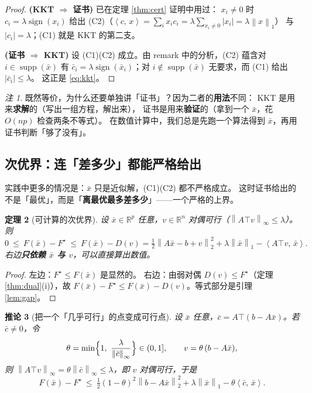 \documentclass[11pt,a4paper,UTF8]{ctexart}
\theoremstyle{plain}
\newtheorem{theorem}{定理}[section]
\newtheorem{corollary}[theorem]{推论}
\theoremstyle{definition}
\theoremstyle{remark}
\newtheorem{remark}[theorem]{注}
\newcommand{\R}{\mathbb{R}}
\newcommand{\norm}[1]{\left\lVert #1 \right\rVert}
\newcommand{\abs}[1]{\left\lvert #1 \right\rvert}
\newcommand{\inner}[2]{\left\langle #1,\, #2 \right\rangle}
\newcommand{\supp}{\operatorname{supp}}
\DeclareMathOperator{\sign}{sign}
\begin{document}
\begin{proof}
\textbf{(KKT $\Rightarrow$ 证书)} 已在定理 \ref{thm:cert} 证明中用过：
$x_i\neq0$ 时 $c_i=\lambda\sign(x_i)$ 给出 (C2)（$\inner cx=\sum_i x_ic_i=\lambda\sum_{x_i\neq0}\abs{x_i}=\lambda\norm x_1$）
与 $\abs{c_i}=\lambda$；(C1) 就是 KKT 的第二支。

\textbf{(证书 $\Rightarrow$ KKT)} 设 (C1)(C2) 成立。由 remark 中的分析，(C2) 蕴含对 $i\in\supp(\bar x)$
有 $\bar c_i=\lambda\sign(\bar x_i)$；对 $i\notin\supp(\bar x)$ 无要求，而 (C1) 给出 $\abs{\bar c_i}\le\lambda$。
这正是 \eqref{eq:kkt}。
\end{proof}

\begin{remark}
既然等价，为什么还要单独讲「证书」？因为二者的\textbf{用法}不同：
KKT 是用来\textbf{求解}的（写出一组方程，解出来），
证书是用来\textbf{验证}的（拿到一个 $\bar x$，花 $O(np)$ 检查两条不等式）。
在数值计算中，我们总是先跑一个算法得到 $\bar x$，再用证书判断「够了没有」。
\end{remark}

\subsection{次优界：连「差多少」都能严格给出}

实践中更多的情况是：$\bar x$ 只是近似解，(C1)(C2) 都不严格成立。
这时证书给出的不是「最优」，而是「\textbf{离最优最多差多少}」——一个严格的上界。

\begin{theorem}[可计算的次优界]\label{thm:subopt}
设 $\bar x\in\R^p$ 任意，$v\in\R^n$ 对偶可行（$\norm{A\top v}_\infty\le\lambda$）。则
\begin{equation}
0\ \le\ F(\bar x)-F^\star\ \le\ F(\bar x)-D(v)
=\tfrac12\norm{A\bar x-b+v}_2^2+\lambda\norm{\bar x}_1-\inner{A\top v}{\bar x}.
\label{eq:subopt}
\end{equation}
右边\textbf{只依赖 $\bar x$ 与 $v$}，可以直接算出数值。
\end{theorem}

\begin{proof}
左边：$F^\star\le F(\bar x)$ 是显然的。
右边：由弱对偶 $D(v)\le F^\star$（定理 \ref{thm:dual}(i)），故
$F(\bar x)-F^\star\le F(\bar x)-D(v)$。等式部分是引理 \ref{lem:gap}。
\end{proof}

\begin{corollary}[把一个「几乎可行」的点变成可行点]\label{cor:scaling}
设 $\bar x$ 任意，$\bar c=A\top(b-A\bar x)$。若 $\bar c\neq0$，令
\[
\theta=\min\Bigl\{1,\ \frac{\lambda}{\norm{\bar c}_\infty}\Bigr\}\in(0,1],
\qquad v=\theta\,(b-A\bar x),
\]
则 $\norm{A\top v}_\infty=\theta\norm{\bar c}_\infty\le\lambda$，即 $v$ 对偶可行，于是
\begin{equation}
F(\bar x)-F^\star\ \le\ \tfrac12(1-\theta)^2\norm{b-A\bar x}_2^2+\lambda\norm{\bar x}_1-\theta\inner{\bar c}{\bar x}.
\label{eq:scaledgap}
\end{equation}
\end{corollary}
\end{document}

